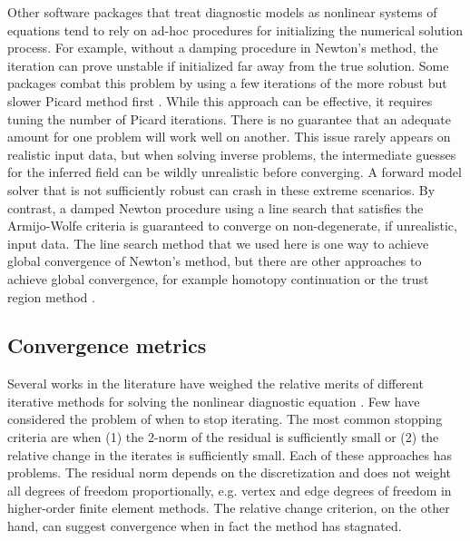 \documentclass[journal abbreviation, manuscript]{copernicus}
\begin{document}
Other software packages that treat diagnostic models as nonlinear systems of equations tend to rely on ad-hoc procedures for initializing the numerical solution process.
For example, without a damping procedure in Newton's method, the iteration can prove unstable if initialized far away from the true solution.
Some packages combat this problem by using a few iterations of the more robust but slower Picard method first \citep{gagliardini2013capabilities}.
While this approach can be effective, it requires tuning the number of Picard iterations.
There is no guarantee that an adequate amount for one problem will work well on another.
This issue rarely appears on realistic input data, but when solving inverse problems, the intermediate guesses for the inferred field can be wildly unrealistic before converging.
A forward model solver that is not sufficiently robust can crash in these extreme scenarios.
By contrast, a damped Newton procedure using a line search that satisfies the Armijo-Wolfe criteria is guaranteed to converge on non-degenerate, if unrealistic, input data.
The line search method that we used here is one way to achieve global convergence of Newton's method, but there are other approaches to achieve global convergence, for example homotopy continuation \citep{tezaur2015albany} or the trust region method \citep{bellavia2007globalization}.


\subsection{Convergence metrics} \label{sec:convergence-criteria}

Several works in the literature have weighed the relative merits of different iterative methods for solving the nonlinear diagnostic equation \citep{perego2012parallel}.
Few have considered the problem of when to stop iterating.
The most common stopping criteria are when (1) the 2-norm of the residual is sufficiently small or (2) the relative change in the iterates is sufficiently small.
Each of these approaches has problems.
The residual norm depends on the discretization and does not weight all degrees of freedom proportionally, e.g. vertex and edge degrees of freedom in higher-order finite element methods.
The relative change criterion, on the other hand, can suggest convergence when in fact the method has stagnated.
\end{document}
